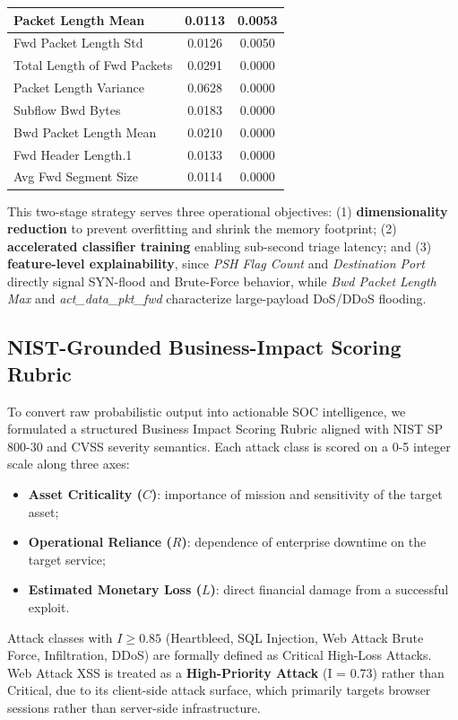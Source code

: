\documentclass[conference]{IEEEtran}
\begin{document}
\begin{table}[htbp]
{\begin{tabular}{|l|c|c|}
Packet Length Mean           & 0.0113 & 0.0053 \\ \hline
Fwd Packet Length Std        & 0.0126 & 0.0050 \\ \hline
Total Length of Fwd Packets  & 0.0291 & 0.0000 \\ \hline
Packet Length Variance       & 0.0628 & 0.0000 \\ \hline
Subflow Bwd Bytes            & 0.0183 & 0.0000 \\ \hline
Bwd Packet Length Mean       & 0.0210 & 0.0000 \\ \hline
Fwd Header Length.1          & 0.0133 & 0.0000 \\ \hline
Avg Fwd Segment Size         & 0.0114 & 0.0000 \\ \hline
\end{tabular}%
}
\end{table}

This two-stage strategy serves three operational objectives: 
(1) \textbf{dimensionality reduction} to prevent overfitting and 
shrink the memory footprint; (2) \textbf{accelerated classifier 
training} enabling sub-second triage latency; and (3) \textbf{feature-level explainability}, since \textit{PSH Flag Count} and 
\textit{Destination Port} directly signal SYN-flood and Brute-Force 
behavior, while \textit{Bwd Packet Length Max} and 
\textit{act\_data\_pkt\_fwd} characterize large-payload DoS/DDoS 
flooding.

\subsection{NIST-Grounded Business-Impact Scoring Rubric}
To convert raw probabilistic output into actionable SOC intelligence, we formulated a structured Business Impact Scoring Rubric aligned with NIST SP 800-30 \cite{c21,c22} and CVSS severity semantics. Each attack class is scored on a 0-5 integer scale along three axes:
\begin{itemize}
    \item \textbf{Asset Criticality ($C$)}: importance of mission and sensitivity of the target asset;
    \item \textbf{Operational Reliance ($R$)}: dependence of enterprise downtime on the target service;
    \item \textbf{Estimated Monetary Loss ($L$)}: direct financial damage from a successful exploit.
\end{itemize}

Attack classes with $I \ge 0.85$ (Heartbleed, SQL Injection, Web 
Attack Brute Force, Infiltration, DDoS) are formally defined as 
Critical High-Loss Attacks. Web Attack XSS is treated as a 
\textbf{High-Priority Attack} (I = 0.73) rather than Critical, due 
to its client-side attack surface, which primarily targets browser 
sessions rather than server-side infrastructure.
\end{document}
